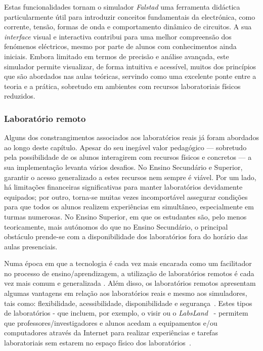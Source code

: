 Estas funcionalidades tornam o simulador \textit{Falstad} uma ferramenta didáctica particularmente útil para introduzir conceitos fundamentais da electrónica, como corrente, tensão, formas de onda e comportamento dinâmico de circuitos. A sua \textit{interface} visual e interactiva contribui para uma melhor compreensão dos fenómenos eléctricos, mesmo por parte de alunos com conhecimentos ainda iniciais. Embora limitado em termos de precisão e análise avançada, este simulador permite visualizar, de forma intuitiva e acessível, muitos dos princípios que são abordados nas aulas teóricas, servindo como uma excelente ponte entre a teoria e a prática, sobretudo em ambientes com recursos laboratoriais físicos reduzidos.

\subsubsection{Laboratório remoto}
\label{sec: remotelaboratory}
Alguns dos constrangimentos associados aos laboratórios reais já foram abordados ao longo deste capítulo. Apesar do seu inegável valor pedagógico — sobretudo pela possibilidade de os alunos interagirem com recursos físicos e concretos — a sua implementação levanta vários desafios. No Ensino Secundário e Superior, garantir o acesso generalizado a estes recursos nem sempre é viável. Por um lado, há limitações financeiras significativas para manter laboratórios devidamente equipados; por outro, torna-se muitas vezes incomportável assegurar condições para que todos os alunos realizem experiências em simultâneo, especialmente em turmas numerosas. No Ensino Superior, em que os estudantes são, pelo menos teoricamente, mais autónomos do que no Ensino Secundário, o principal obstáculo prende-se com a disponibilidade dos laboratórios fora do horário das aulas presenciais.

Numa época em que a tecnologia é cada vez mais encarada como um facilitador no processo de ensino/aprendizagem, a utilização de laboratórios remotos é cada vez mais comum e generalizada \cite{RemoteLabsImpactVISIR}. Além disso, os laboratórios remotos apresentam algumas vantagens em relação aos laboratórios reais e mesmo aos simuladores, tais como: flexibilidade, acessibilidade, disponibilidade e segurança~\cite{RemoteLabsImpactVISIR}. Estes tipos de laboratórios - que incluem, por exemplo, o \acrshort{visir} ou o \textit{LabsLand}~\cite{labsland} - permitem que professores/investigadores e alunos acedam a equipamentos e/ou computadores através da Internet para realizar experiências e tarefas laboratoriais sem estarem no espaço físico dos laboratórios~\cite{ExperiencesRemoteLab}.

